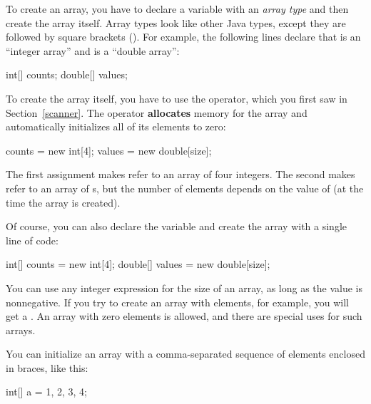 
To create an array, you have to declare a variable with an {\em array type} and then create the array itself.
Array types look like other Java types, except they are followed by square brackets (\java{[]}).
For example, the following lines declare that  is an ``integer array'' and  is a ``double array'':

\begin{code}
int[] counts;
double[] values;
\end{code}


To create the array itself, you have to use the  operator, which you first saw in Section~\ref{scanner}.
The  operator {\bf allocates} memory for the array and automatically initializes all of its elements to zero:

\begin{code}
counts = new int[4];
values = new double[size];
\end{code}

The first assignment makes  refer to an array of four integers.
The second makes  refer to an array of s, but the number of elements depends on the value of  (at the time the array is created).

Of course, you can also declare the variable and create the array with a single line of code:

\begin{code}
int[] counts = new int[4];
double[] values = new double[size];
\end{code}


You can use any integer expression for the size of an array, as long as the value is nonnegative.
If you try to create an array with  elements, for example, you will get a .
An array with zero elements is allowed, and there are special uses for such arrays.

You can initialize an array with a comma-separated sequence of elements enclosed in braces, like this:

\begin{code}
int[] a = {1, 2, 3, 4};
\end{code}

